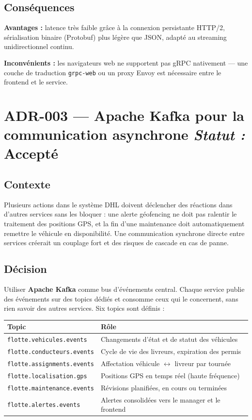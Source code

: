 \documentclass[10pt,a4paper]{article}
\newcommand{\adrstatus}[1]{\hfill{\small\color{muted}\textit{Statut :} \textbf{#1}}}
\begin{document}
\subsection{Conséquences}
\textbf{Avantages :} latence très faible grâce à la connexion persistante HTTP/2, sérialisation binaire (Protobuf) plus légère que JSON, adapté au streaming unidirectionnel continu.

\noindent\textbf{Inconvénients :} les navigateurs web ne supportent pas gRPC nativement --- une couche de traduction \texttt{grpc-web} ou un proxy Envoy est nécessaire entre le frontend et le service.

\section{ADR-003 --- Apache Kafka pour la communication asynchrone \adrstatus{Accepté}}

\subsection{Contexte}
Plusieurs actions dans le système DHL doivent déclencher des réactions dans d'autres services sans les bloquer : une alerte géofencing ne doit pas ralentir le traitement des positions GPS, et la fin d'une maintenance doit automatiquement remettre le véhicule en disponibilité. Une communication synchrone directe entre services créerait un couplage fort et des risques de cascade en cas de panne.

\subsection{Décision}
Utiliser \textbf{Apache Kafka} comme bus d'événements central. Chaque service publie des événements sur des topics dédiés et consomme ceux qui le concernent, sans rien savoir des autres services. Six topics sont définis :

\vspace{4pt}
\begin{tabularx}{\linewidth}{lX}
  \toprule
  \small\textbf{Topic} & \small\textbf{Rôle} \\
  \midrule
  \texttt{flotte.vehicules.events}    & Changements d'état et de statut des véhicules \\
  \texttt{flotte.conducteurs.events}  & Cycle de vie des livreurs, expiration des permis \\
  \texttt{flotte.assignments.events}  & Affectation véhicule $\leftrightarrow$ livreur par tournée \\
  \texttt{flotte.localisation.gps}    & Positions GPS en temps réel (haute fréquence) \\
  \texttt{flotte.maintenance.events}  & Révisions planifiées, en cours ou terminées \\
  \texttt{flotte.alertes.events}      & Alertes consolidées vers le manager et le frontend \\
  \bottomrule
\end{tabularx}
\end{document}
